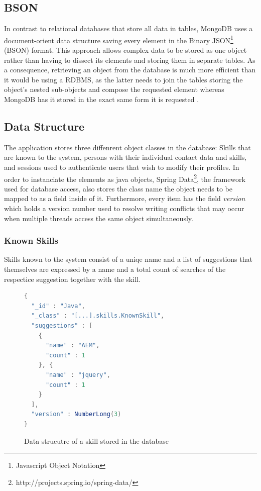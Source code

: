 \subsection{BSON}
\label{BSON}
In contrast to relational databases that store all data in tables, MongoDB uses a document-orient data structure saving every element in the Binary JSON\footnote{Javascript Object Notation} (BSON) format. This approach allows complex data to be stored as one object rather than having to dissect its elements and storing them in separate tables. As a consequence, retrieving an object from the database is much more efficient than it would be using a RDBMS, as the latter needs to join the tables storing the object's nested sub-objects and compose the requested element whereas MongoDB has it stored in the exact same form it is requested \cite[p. 10]{MongoGuide}.

\subsection{Data Structure}
The application stores three diffenrent object classes in the database: Skills that are known to the system, persons with their individual contact data and skills, and sessions used to authenticate users that wish to modify their profiles. In order to instanciate the elements as java objects, Spring Data\footnote{http://projects.spring.io/spring-data/}, the framework used for database access, also stores the class name the object needs to be mapped to as a field inside of it. Furthermore, every item has the field \textit{version} which holds a version number used to resolve writing conflicts that may occur when multiple threads access the same object simultaneously.

\newpage
\subsubsection{Known Skills}
Skills known to the system consist of a uniqe name and a list of suggestions that themselves are expressed by a name and a total count of searches of the respectice suggestion together with the skill.
\begin{figure}[h]
\begin{lstlisting}[language=Java]
{
  "_id" : "Java",
  "_class" : "[...].skills.KnownSkill",
  "suggestions" : [
    {
      "name" : "AEM",
      "count" : 1
    }, {
      "name" : "jquery",
      "count" : 1
    }
  ],
  "version" : NumberLong(3)
}
\end{lstlisting}
\caption[Skill (DB Data Structure)]{Data strucutre of a skill stored in the database}
\end{figure}

